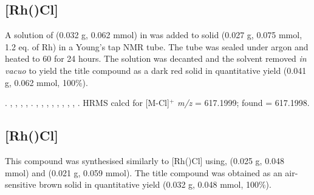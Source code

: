
\subsection*{[Rh(\tBusixantphosk)Cl]}


A solution of \tBusixantphos{} (0.032 g, 0.062 mmol) in  was added to solid \ce{[Rh(COE)2Cl]} (0.027 g, 0.075 mmol, 1.2 eq. of Rh) in a Young's tap NMR tube.  The tube was sealed under argon and heated to 60 \degC{} for 24 hours.  The solution was decanted and the solvent removed \emph{in vacuo} to yield the title compound as a dark red solid in quantitative yield (0.041 g, 0.062 mmol, 100\%).

.
,
,
,
,
.
,
,
,
,
,
,
,
,
.
HRMS calcd for  [M-Cl]$^+$ \emph{m/z} = 617.1999; found = 617.1998.



\subsection*{[Rh(\tButhixantphosk)Cl]}


This compound was synthesised similarly to [Rh(\tBusixantphos)Cl] using, \tButhixantphos{} (0.025 g, 0.048 mmol) and  (0.021 g, 0.059 mmol).  The title compound was obtained as an air-sensitive brown solid in quantitative yield (0.032 g, 0.048 mmol, 100\%).  

